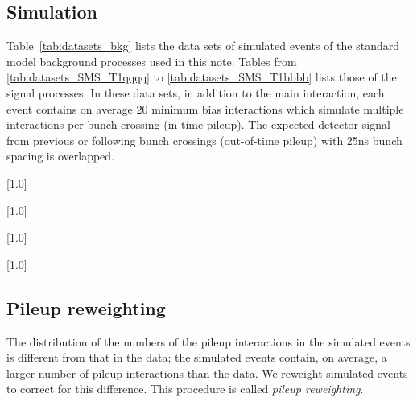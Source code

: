 \subsection{Simulation}

Table~\ref{tab:datasets_bkg} lists the data sets of simulated events
of the standard model background processes used in this note. Tables
from \ref{tab:datasets_SMS_T1qqqq} to \ref{tab:datasets_SMS_T1bbbb}
lists those of the signal processes. In these data sets, in addition
to the main interaction, each event contains on average 20 minimum
bias interactions which simulate multiple interactions per
bunch-crossing (in-time pileup). The expected detector signal from
previous or following bunch crossings (out-of-time pileup) with 25ns
bunch spacing is overlapped.

\begin{table}[!h]
 \centering
 \scriptsize
 \scalebox{.7}[1.0]{}
 \label{tab:datasets_bkg}
\end{table}

\begin{table}[!p]
 \centering
 \scriptsize
 \scalebox{.7}[1.0]{}
\label{tab:datasets_SMS_T1qqqq}
\end{table}

\begin{table}[!p]
 \centering
{}
 \scriptsize
 \scalebox{.7}[1.0]{}
\end{table}

\begin{table}[!p]
 \centering
{}
 \scriptsize
 \scalebox{.7}[1.0]{}
\label{tab:datasets_SMS_T1bbbb}
\end{table}

\clearpage

\subsection{Pileup reweighting}
\label{sec:pileup-reweighting}

The distribution of the numbers of the pileup interactions in the
simulated events is different from that in the data; the simulated
events contain, on average, a larger number of pileup interactions than
the data. We reweight simulated events to correct for this difference.
This procedure is called \textit{pileup reweighting}.

